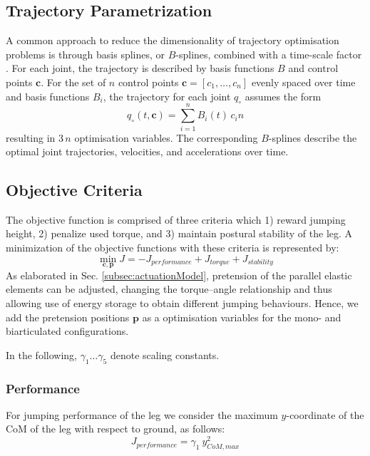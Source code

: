 \documentclass[letterpaper, 10 pt, conference]{ieeeconf}  %
\begin{document}
\subsection{Trajectory Parametrization} 
\label{subsec:trajectoryParametrization}
A common approach to reduce the dimensionality of trajectory optimisation problems is through basis splines, or $B$-splines, combined with a time-scale factor \cite{ude2000planning,babivc2009biarticulated,wang1999weight,albro2001optimal}. For each joint, the trajectory is described by basis functions $B$ and control points $\mathbf{c}$. For the set of $n$ control points $\mathbf{c}=\left[c_1,\dots,c_n\right]$ evenly spaced over time and basis functions $B_i$, the trajectory for each joint $q_\circ$ assumes the form
\begin{equation}
	q_\circ(t,\mathbf{c}) = \sum_{i=1}^{n} B_i (t) \, c_in
\end{equation}
resulting in $3 \, n$ optimisation variables. The corresponding $B$-splines describe the optimal joint trajectories, velocities, and accelerations over time.

\subsection{Objective Criteria} 
\label{subsec:objectiveCriteria}
The objective function is comprised of three criteria which 1) reward jumping height, 2) penalize used torque, and 3) maintain postural stability of the leg. A minimization of the objective functions with these criteria is represented by:
\begin{equation}
	\min_{\mathbf{c}, \mathbf{p}} J = -J_{performance} + J_{torque} + J_{stability}
\end{equation}
As elaborated in Sec. \ref{subsec:actuationModel}, pretension of the parallel elastic elements can be adjusted, changing the torque--angle relationship and thus allowing use of energy storage to obtain different jumping behaviours. Hence, we add the pretension positions $\mathbf{p}$ as a optimisation variables for the mono- and biarticulated configurations.

In the following, $\gamma_1 \dots \gamma_5$ denote scaling constants.

\subsubsection{Performance}
For jumping performance of the leg we consider the maximum $y$-coordinate of the CoM of the leg with respect to ground, as follows:
\begin{equation}
	J_{performance} = \gamma_1 \: y_{CoM,max}^2
\end{equation}
\end{document}
